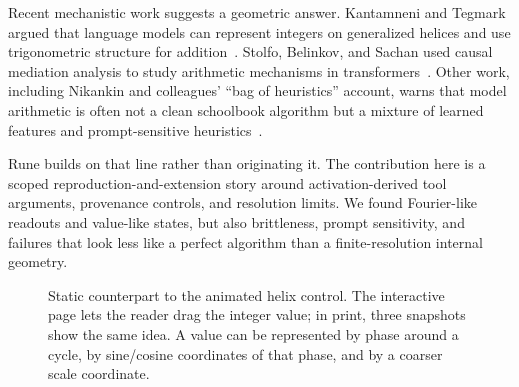 \documentclass[acmsmall,screen,nonacm]{acmart}
\begin{document}
Recent mechanistic work suggests a geometric answer. Kantamneni and Tegmark
argued that language models can represent integers on generalized helices and
use trigonometric structure for addition~\cite{kantamneni2025}. Stolfo,
Belinkov, and Sachan used causal mediation analysis to study arithmetic
mechanisms in transformers~\cite{stolfo2023}. Other work, including Nikankin
and colleagues' ``bag of heuristics'' account, warns that model arithmetic is
often not a clean schoolbook algorithm but a mixture of learned features and
prompt-sensitive heuristics~\cite{nikankin2024}.

Rune builds on that line rather than originating it. The contribution here is a
scoped reproduction-and-extension story around activation-derived tool
arguments, provenance controls, and resolution limits. We found Fourier-like
readouts and value-like states, but also brittleness, prompt sensitivity, and
failures that look less like a perfect algorithm than a finite-resolution
internal geometry.

\begin{figure}[t]
  \centering
  \caption{Static counterpart to the animated helix control. The interactive
  page lets the reader drag the integer value; in print, three snapshots show
  the same idea. A value can be represented by phase around a cycle, by
  sine/cosine coordinates of that phase, and by a coarser scale coordinate.}
\end{figure}
\end{document}
